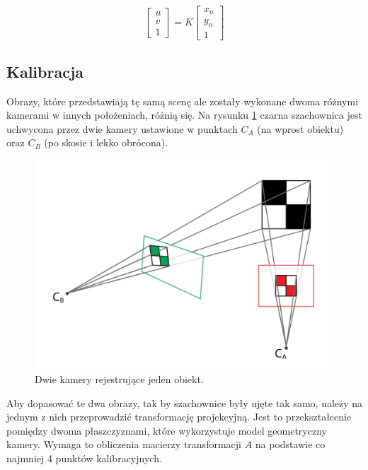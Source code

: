 \begin{equation}
\begin{bmatrix}
u \\
v \\
1
\end{bmatrix} = K \begin{bmatrix}
x_n \\
y_n \\
1
\end{bmatrix}
\end{equation}

\subsection{Kalibracja}
Obrazy, które przedstawiają tę samą scenę ale zostały wykonane dwoma różnymi kamerami w innych położeniach, różnią się. Na rysunku \ref{fig:oneSceaneTwoCameras} czarna szachownica jest uchwycona przez dwie kamery ustawione w punktach $C_A$ (na wprost obiektu) oraz $C_B$ (po skosie i lekko obrócona).

\begin{figure}
\centering
\includegraphics[width=0.6\linewidth]{images/oneSceaneTwoCameras}
\caption[Dwie kamery rejestrujące jeden obiekt. ]{Dwie kamery rejestrujące jeden obiekt.}
\label{fig:oneSceaneTwoCameras}
\end{figure}

Aby dopasować te dwa obrazy, tak by szachownice były ujęte tak samo, należy na jednym z nich przeprowadzić transformację projekcyjną. Jest to przekształcenie pomiędzy dwoma płaszczyznami, które wykorzystuje model geometryczny kamery. Wymaga to obliczenia macierzy transformacji $A$ na podstawie co najmniej 4 punktów kalibracyjnych.

